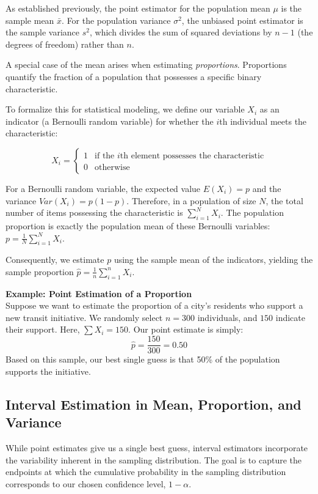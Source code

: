 \documentclass{article}
\begin{document}
As established previously, the point estimator for the population mean $\mu$ is the sample mean $\bar{x}$. For the population variance $\sigma^2$, the unbiased point estimator is the sample variance $s^2$, which divides the sum of squared deviations by $n-1$ (the degrees of freedom) rather than $n$.

A special case of the mean arises when estimating \emph{proportions}. Proportions quantify the fraction of a population that possesses a specific binary characteristic. 

To formalize this for statistical modeling, we define our variable $X_i$ as an indicator (a Bernoulli random variable) for whether the $i$th individual meets the characteristic:

$$X_i=\begin{cases}1&\text{if the }i\text{th element possesses the characteristic}\\0&\text{otherwise}\end{cases}$$

For a Bernoulli random variable, the expected value $E(X_i)=p$ and the variance $Var(X_i)=p(1-p)$. Therefore, in a population of size $N$, the total number of items possessing the characteristic is $\sum_{i=1}^{N}X_i$. The population proportion is exactly the population mean of these Bernoulli variables: $p=\frac{1}{N}\sum_{i=1}^{N}X_i$. 

Consequently, we estimate $p$ using the sample mean of the indicators, yielding the sample proportion $\hat{p}=\frac{1}{n}\sum_{i=1}^{n}X_i$.

\textbf{Example: Point Estimation of a Proportion} \\
Suppose we want to estimate the proportion of a city's residents who support a new transit initiative. We randomly select $n=300$ individuals, and $150$ indicate their support. Here, $\sum X_i=150$. Our point estimate is simply:
$$\hat{p}=\frac{150}{300}=0.50$$
Based on this sample, our best single guess is that 50\% of the population supports the initiative.

\subsection{Interval Estimation in Mean, Proportion, and Variance}

While point estimates give us a single best guess, interval estimators incorporate the variability inherent in the sampling distribution. The goal is to capture the endpoints at which the cumulative probability in the sampling distribution corresponds to our chosen confidence level, $1-\alpha$.
\end{document}
